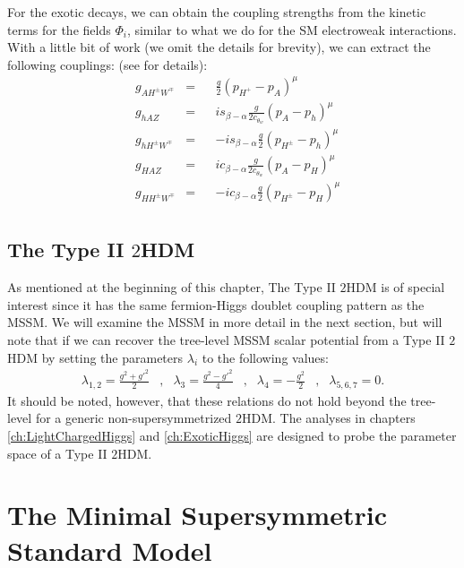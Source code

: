 For the exotic decays, we can obtain the coupling strengths from the kinetic terms for the fields $\Phi_i$, similar to what we do for the SM electroweak interactions. With a little bit of work (we omit the details for brevity), we can extract the following couplings: (see \citep{Kling2016a} for details):
\begin{align*}
& g_{AH^\pm W^\mp} & = && \frac{g}{2}(p_{H^+}-p_{A})^\mu\\
& g_{hAZ}          & = && is_{\beta-\alpha}\frac{g}{2c_{\theta_w}}(p_A-p_h)^\mu\\
& g_{hH^\pm W^\mp} & = && -is_{\beta-\alpha}\frac{g}{2}(p_{H^\pm}-p_h)^\mu\\
& g_{HAZ}          & = && ic_{\beta-\alpha}\frac{g}{2c_{\theta_w}}(p_A-p_H)^\mu\\
& g_{HH^\pm W^\mp} & = && -ic_{\beta-\alpha}\frac{g}{2}(p_{H^\pm}-p_H)^\mu\\
\end{align*}

\subsection{The Type II $2$HDM}

As mentioned at the beginning of this chapter, The Type II $2$HDM is of special interest since it has the same fermion-Higgs doublet coupling pattern as the MSSM. We will examine the MSSM in more detail in the next section, but will note that if we can recover the tree-level MSSM scalar potential from a Type II $2$HDM by setting the parameters $\lambda_i$ to the following values:
\begin{align}
\lambda_{1,2} = \frac{g^2+g'^2}{2} &,& \lambda_3 = \frac{g^2-g'^2}{4} &,& \lambda_4 = -\frac{g^2}{2}&,&\lambda_{5,6,7} = 0.
\end{align}
It should be noted, however, that these relations do not hold beyond the tree-level for a generic non-supersymmetrized $2$HDM.
The analyses in chapters \ref{ch:LightChargedHiggs} and \ref{ch:ExoticHiggs} are designed to probe the parameter space of a Type II $2$HDM.
\section{The Minimal Supersymmetric Standard Model}\label{sec:supersymmetry}

